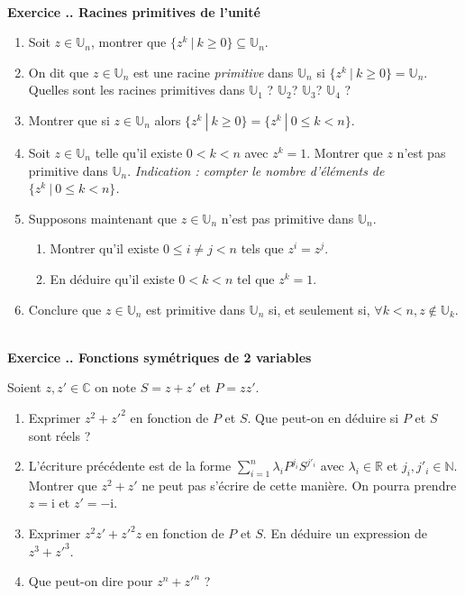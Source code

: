 \documentclass{article}
\newcommand{\mb}[1]{\mathbb{#1}}
\newcounter{exo}
\newcommand{\exercice}[1][\null]{\textbf{\\ \large Exercice \thesection.\theexo. \normalsize #1} \addtocounter{exo}{1}}
\begin{document}
\exercice[Racines primitives de l'unité]

\begin{enumerate}

\item Soit $z \in \mb{U}_n$, montrer que $\{z^k~|~k \ge 0\} \subseteq \mb{U}_n$.

\item On dit que $z \in \mb{U}_n$ est une racine \emph{primitive} dans $\mb{U}
_n$ si  $\{z^k~|~k \ge 0\} = \mb{U}_n$. Quelles sont les racines primitives dans  $\mb{U}_1$ ? $\mb{U}_2$? $\mb{U}_3$? $\mb{U}_4$ ?

\item Montrer que si $z \in \mb{U}_n$ alors $\{z^k~|~k \ge 0\} = \{z^k~|~0 \le k < n\}$.

\item  Soit $z \in \mb{U}_n$ telle qu'il existe $ 0 < k < n$ avec $z^k = 1$. Montrer que $z$ n'est pas primitive dans $\mb{U}_n$.
\emph{Indication : compter le nombre d'éléments de $\{z^k~|~0 \le k < n\}$.}

\item Supposons maintenant que $z \in \mb{U}_n$ n'est pas primitive dans $\mb{U}_n$.  \begin{enumerate} 

\item Montrer qu'il existe $0 \le i\neq j < n$ tels que $z^i = z^j$.
\item En déduire qu'il existe $0 < k < n$ tel que $z^k = 1$.

\end{enumerate}

\item Conclure que $z \in \mb{U}_n$ est primitive dans $\mb{U}_n$ si, et seulement si, $\forall k < n, z \not \in \mb{U}_k$.

\end{enumerate}



\exercice[Fonctions symétriques de 2 variables]

Soient $z, z' \in \mb{C}$ on note $S = z + z'$ et $P = z z'$.

\begin{enumerate}

\item Exprimer $z^2 + z'^2$ en fonction de $P$ et $S$. Que peut-on en déduire si $P$ et $S$ sont réels ?

\item L'écriture précédente est de la forme $\sum_{i=1}^n \lambda_i P^{j_i} S^{j'_i}$ avec $\lambda_i \in \mb{R}$ et $j_i, j'_i \in \mb{N}$. Montrer que $z^2 + z'$ ne peut pas s'écrire de cette manière. On pourra prendre $z = \text{i}$ et $z' = - \text{i}$.

\item Exprimer $z^2 z' + z'^2z $ en fonction de $P$ et $S$. En déduire un expression de $z^3 + z'^3$.

\item Que peut-on dire pour $z^n + z'^n$ ?

\end{enumerate}
\end{document}
